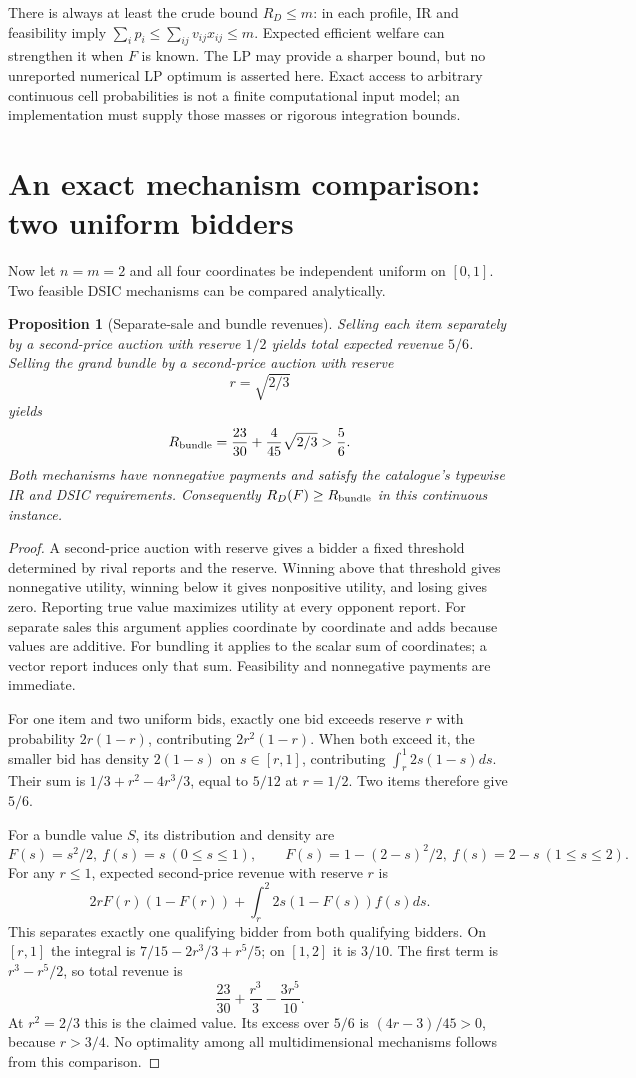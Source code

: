\documentclass[11pt,a4paper]{article}
\newtheorem{proposition}[theorem]{Proposition}
\theoremstyle{remark}
\begin{document}
There is always at least the crude bound $R_D\le m$: in each profile, IR and feasibility imply $\sum_i p_i\le\sum_{ij}v_{ij}x_{ij}\le m$. Expected efficient welfare can strengthen it when $F$ is known. The LP may provide a sharper bound, but no unreported numerical LP optimum is asserted here. Exact access to arbitrary continuous cell probabilities is not a finite computational input model; an implementation must supply those masses or rigorous integration bounds.

\section{An exact mechanism comparison: two uniform bidders}
Now let $n=m=2$ and all four coordinates be independent uniform on $[0,1]$. Two feasible DSIC mechanisms can be compared analytically.

\begin{proposition}[Separate-sale and bundle revenues]
Selling each item separately by a second-price auction with reserve $1/2$ yields total expected revenue $5/6$. Selling the grand bundle by a second-price auction with reserve
\[
 r=\sqrt{2/3}
\]
yields
\[
 R_{\rm bundle}=\frac{23}{30}+\frac4{45}\sqrt{2/3}>\frac56.
\]
Both mechanisms have nonnegative payments and satisfy the catalogue's typewise IR and DSIC requirements. Consequently $R_D(F)\ge R_{\rm bundle}$ in this continuous instance.
\end{proposition}
\begin{proof}
A second-price auction with reserve gives a bidder a fixed threshold determined by rival reports and the reserve. Winning above that threshold gives nonnegative utility, winning below it gives nonpositive utility, and losing gives zero. Reporting true value maximizes utility at every opponent report. For separate sales this argument applies coordinate by coordinate and adds because values are additive. For bundling it applies to the scalar sum of coordinates; a vector report induces only that sum. Feasibility and nonnegative payments are immediate.

For one item and two uniform bids, exactly one bid exceeds reserve $r$ with probability $2r(1-r)$, contributing $2r^2(1-r)$. When both exceed it, the smaller bid has density $2(1-s)$ on $s\in[r,1]$, contributing $\int_r^1 2s(1-s)ds$. Their sum is $1/3+r^2-4r^3/3$, equal to $5/12$ at $r=1/2$. Two items therefore give $5/6$.

For a bundle value $S$, its distribution and density are
\[
 F(s)=s^2/2,\ f(s)=s\ (0\le s\le1),\qquad
 F(s)=1-(2-s)^2/2,\ f(s)=2-s\ (1\le s\le2).
\]
For any $r\le1$, expected second-price revenue with reserve $r$ is
\[
 2rF(r)(1-F(r))+\int_r^2 2s(1-F(s))f(s)ds.
\]
This separates exactly one qualifying bidder from both qualifying bidders. On $[r,1]$ the integral is $7/15-2r^3/3+r^5/5$; on $[1,2]$ it is $3/10$. The first term is $r^3-r^5/2$, so total revenue is
\[
 \frac{23}{30}+\frac{r^3}{3}-\frac{3r^5}{10}.
\]
At $r^2=2/3$ this is the claimed value. Its excess over $5/6$ is $(4r-3)/45>0$, because $r>3/4$. No optimality among all multidimensional mechanisms follows from this comparison.
\end{proof}
\end{document}
